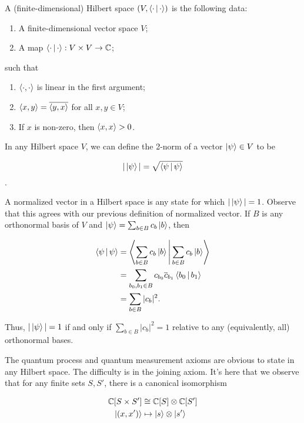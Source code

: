 \begin{definition} A (finite-dimensional) Hilbert space $(V,\Braket{\cdot | \cdot})$ is the following data:

\begin{enumerate}
\item A finite-dimensional vector space $V$;
\item A map $\Braket{\cdot | \cdot}:V\times V\to \mathbb{C}$;
\end{enumerate}

such that

\begin{enumerate}
\item $\Braket{\cdot,\cdot}$ is linear in the first argument;
\item $\Braket{x,y}=\overline{\Braket{y,x}}$ for all $x,y\in V$;
\item If $x$ is non-zero, then $\Braket{x,x}>0$.
\end{enumerate}

\raggedleft\qedsymbol{}
\end{definition}

In any Hilbert space $V$, we can define the 2-norm of a vector $\ket{\psi}\in V$ to be

$$|\ket{\psi}|=\sqrt{\Braket{\psi | \psi}}$$.

A normalized vector in a Hilbert space is any state for which $|\ket{\psi}|=1$. Observe that this agrees with our previous definition of normalized vector. If $B$ is any orthonormal basis of $V$ and $\ket{\psi}=\sum_{b\in B}c_b \ket{b}$, then

\begin{align*}
\Braket{\psi|\psi}&=\Braket{\sum_{b\in B}c_b\left|b\right>|\sum_{b\in B}c_b \left|b\right>}\\
&=\sum_{b_0,b_1\in B}c_{b_0}\overline{c}_{b_1}\Braket{b_0 | b_1}\\
&=\sum_{b\in B} |c_b|^2.
\end{align*}

Thus, $|\ket{\psi}|=1$ if and only if $\sum_{b\in B} |c_b|^2=1$ relative to any (equivalently, all) orthonormal bases.

The quantum process and quantum measurement axioms are obvious to state in any Hilbert space. The difficulty is in the joining axiom. It's here that we observe that for any finite sets $S,S'$, there is a canonical isomorphism

\begin{align*}
\mathbb{C}[S\times S']&\cong \mathbb{C}[S]\otimes \mathbb{C}[S']\\
\ket{(x,x')}&\mapsto \ket{s}\otimes \ket{s'}
\end{align*}

